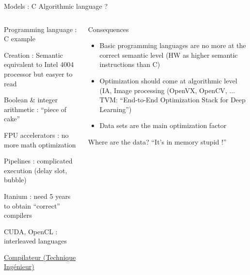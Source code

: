 \begin{Frame}{Models : C Algorithmic language ?}
 \begin{columns}[t]
   \begin{column}{\BW}
     \begin{block}{Programming language : C example }
       \begin{description}[1972]
       \item [1972] Creation : Semantic equivalent to Intel 4004 processor but easyer to
         read
       \item[Optimization] Boolean \& integer arithmetic : ``piece of cake''
       \item[1980] FPU accelerators : no more math optimization
       \item[1990] Pipelines : complicated execution (delay slot, bubble)
       \item[2000] Itanium : need 5 years to obtain ``correct''         compilers
       \item[2007] CUDA, OpenCL : interleaved languages
       \end{description}
    \end{block}
\href{https://www.techniques-ingenieur.fr/base-documentaire/technologies-de-l-information-th9/systemes-d-exploitation-42305210/compilateur-h3168/}{Compilateur (Technique Ingénieur)}
  \end{column}
  \begin{column}{\BW}
      \begin{block}{Consequences}
        \begin{itemize}
        \item Basic programming languages are no more at the correct
          semantic level (HW as higher semantic instructions than C)
        \item Optimization should come at algorithmic level (IA, Image
          processing (OpenVX, OpenCV, ... TVM: ``End-to-End Optimization Stack for Deep Learning'')
        \item Data sets are the main optimization factor
        \end{itemize}
    \end{block}
    \begin{alertblock}{Where are the data? }
      ``It's in memory stupid !''
    \end{alertblock}
  \end{column}
 \end{columns}
\end{Frame}

